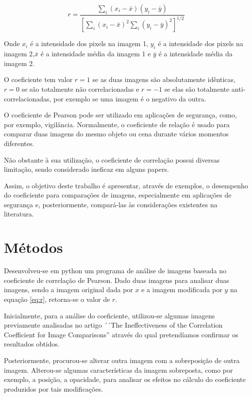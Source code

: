 \documentclass[10pt,a4paper]{article}
\begin{document}
\begin{equation}r = \frac{  
\displaystyle{\sum_{i} (x_i-\bar{x})(y_i-  
\bar{y})}}{\displaystyle{\left[  
\sum_{i}(x_i-\bar{x})^2  
\sum_{i}(y_i-\bar{y})^2\right]^{1/2}}}  \label{eq:r}
\end{equation}  

Onde $x_i$ é a intensidade dos pixels na imagem 1, $y_i$ é a
intensidade dos pixels na imagem 2,$\bar{x}$ é a intensidade média da
imagem 1 e $\bar{y}$ é a intensidade média da imagem 2.

O coeficiente tem valor $r=1$ se as duas imagens são absolutamente
idênticas, $r=0$ se são totalmente não correlacionadas e $r=-1$ se elas
são totalmente anti-correlacionadas, por exemplo se uma imagem é o
negativo da outra.

O coeficiente de Pearson pode ser utilizado em
aplicações de segurança, como, por exemplo, vigilância. Normalmente, 
o coeficiente de relação é usado para comparar duas imagens do mesmo
objeto ou cena durante vários momentos diferentes.

Não obstante à sua utilização, o coeficiente de correlação possui
diversas limitação, sendo considerado ineficaz em alguns papers.%
 
Assim, o objetivo deste trabalho é apresentar, através de exemplos, o
desempenho do coeficiente para comparações de imagens, especialmente
em aplicações de segurança e, posteriormente, compará-las às considerações existentes na literatura.


\section{Métodos}

Desenvolveu-se em python um programa de análise de imagens baseada no
coeficiente de correlação de Pearson. 
Dado duas imagens para analisar duas imagens, sendo a imagem original dada por $x$  e a
imagem modificada por $y$ na equação \eqref{eq:r}, retorna-se o valor de $r$.

Inicialmente, para a análise do coeficiente, utilizou-se algumas imagens
previamente analisadas no artigo ´´The Ineffectiveness of the Correlation
Coefficient for Image Comparisons'' através do qual pretendíamos
confirmar os resultados obtidos.

Posteriormente, procurou-se alterar outra imagem com a
sobreposição de outra imagem. Alterou-se algumas características da
imagem sobreposta, como por exemplo, a posição, a opacidade, para
analisar os efeitos no cálculo do coeficiente produzidos por tais modificações. 
\end{document}
